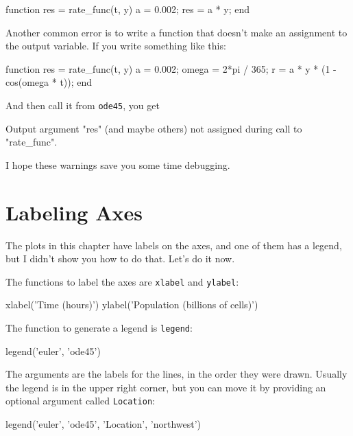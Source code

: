 
\begin{code}
function res = rate_func(t, y)     %
    a = 0.002;
    res = a * y;
end
\end{code}

Another common error is to write a function that doesn't make
an assignment to the output variable.  If you write something
like this:

\begin{code}
function res = rate_func(t, y)
    a = 0.002;
    omega = 2*pi / 365;
    r = a * y * (1 - cos(omega * t));    %
end
\end{code}

And then call it from {\tt ode45}, you get

\begin{code}
Output argument "res" (and maybe others) not assigned during call
to "rate_func".
\end{code}

I hope these warnings save you some time debugging.

\section{Labeling Axes}

The plots in this chapter have labels on the axes, and one of them has a legend, but I didn't show you how to do that.  Let's do it now.


The functions to label the axes are {\tt xlabel} and {\tt ylabel}:

\begin{code}
xlabel('Time (hours)')
ylabel('Population (billions of cells)')
\end{code}

The function to generate a legend is {\tt legend}:

\begin{code}
legend('euler', 'ode45')
\end{code}


The arguments are the labels for the lines, in the order they were drawn.  Usually the legend is in the upper right corner, but you can move it by providing an optional argument called {\tt Location}:

\begin{code}
legend('euler', 'ode45', 'Location', 'northwest')
\end{code}

